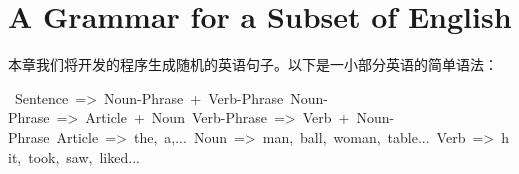 \section{A Grammar for a Subset of English}
本章我们将开发的程序生成随机的英语句子。以下是一小部分英语的简单语法：

\mbox{
	Sentence => Noun-Phrase + Verb-Phrase
	Noun-Phrase => Article + Noun
	Verb-Phrase => Verb + Noun-Phrase
	Article => the, a,...
	Noun => man, ball, woman, table...
	Verb => hit, took, saw, liked...
}
